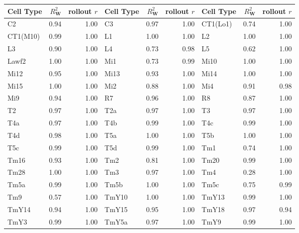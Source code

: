 \begin{tabular}{lrr@{\quad}lrr@{\quad}lrr}
\toprule
Cell Type & $R^2_{\mathbf{W}}$ & rollout $r$ &Cell Type & $R^2_{\mathbf{W}}$ & rollout $r$ & Cell Type & $R^2_{\mathbf{W}}$ & rollout $r$ \\
\midrule
C2         & 0.94 & 1.00 & C3         & 0.97 & 1.00 & CT1(Lo1)   & 0.74 & 1.00 \\
CT1(M10)   & 0.99 & 1.00 & L1         & 1.00 & 1.00 & L2         & 1.00 & 1.00 \\
L3         & 0.90 & 1.00 & L4         & 0.73 & 0.98 & L5         & 0.62 & 1.00 \\
Lawf2      & 1.00 & 1.00 & Mi1        & 0.73 & 0.99 & Mi10       & 1.00 & 1.00 \\
Mi12       & 0.95 & 1.00 & Mi13       & 0.93 & 1.00 & Mi14       & 1.00 & 1.00 \\
Mi15       & 1.00 & 1.00 & Mi2        & 0.88 & 1.00 & Mi4        & 0.91 & 0.98 \\
Mi9        & 0.94 & 1.00 & R7         & 0.96 & 1.00 & R8         & 0.87 & 1.00 \\
T2         & 0.97 & 1.00 & T2a        & 0.97 & 1.00 & T3         & 0.97 & 1.00 \\
T4a        & 0.97 & 1.00 & T4b        & 0.99 & 1.00 & T4c        & 0.99 & 1.00 \\
T4d        & 0.98 & 1.00 & T5a        & 1.00 & 1.00 & T5b        & 1.00 & 1.00 \\
T5c        & 0.99 & 1.00 & T5d        & 0.99 & 1.00 & Tm1        & 0.74 & 1.00 \\
Tm16       & 0.93 & 1.00 & Tm2        & 0.81 & 1.00 & Tm20       & 0.99 & 1.00 \\
Tm28       & 1.00 & 1.00 & Tm3        & 0.97 & 1.00 & Tm4        & 0.28 & 1.00 \\
Tm5a       & 0.99 & 1.00 & Tm5b       & 1.00 & 1.00 & Tm5c       & 0.75 & 0.99 \\
Tm9        & 0.57 & 1.00 & TmY10      & 1.00 & 1.00 & TmY13      & 0.99 & 1.00 \\
TmY14      & 0.94 & 1.00 & TmY15      & 0.95 & 1.00 & TmY18      & 0.97 & 0.94 \\
TmY3       & 0.99 & 1.00 & TmY5a      & 0.97 & 1.00 & TmY9       & 0.99 & 1.00 \\
\bottomrule
\end{tabular}
